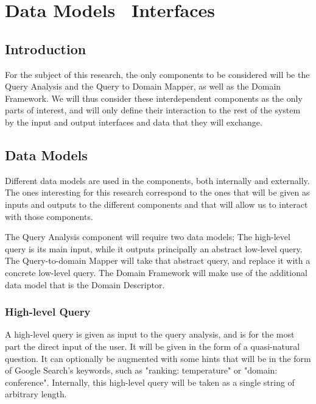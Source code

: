 \chapter{Data Models \amper\ Interfaces} %
\label{cha:data_models_interfaces}

\section{Introduction} %
\label{sec:introduction}

For the subject of this research, the only components to be considered will be the Query Analysis and the Query to Domain Mapper, as well as the Domain Framework. We will thus consider these interdependent components as the only parts of interest, and will only define their interaction to the rest of the system by the input and output interfaces and data that they will exchange.


\section{Data Models} %
\label{sec:data_models}
Different data models are used in the components, both internally and externally. The ones interesting for this research correspond to the ones that will be given as inputs and outputs to the different components and that will allow us to interact with those components.

The Query Analysis component will require two data models; The high-level query is its main input, while it outputs principally an abstract low-level query. The Query-to-domain Mapper will take that abstract query, and replace it with a concrete low-level query. The Domain Framework will make use of the additional data model that is the Domain Descriptor.

\subsection{High-level Query} %
\label{sub:high_level_query}

A high-level query is given as input to the query analysis, and is for the most part the direct input of the user. It will be given in the form of a quasi-natural question. It can optionally be augmented with some hints that will be in the form of Google Search's keywords, such as "ranking: temperature" or "domain: conference". Internally, this high-level query will be taken as a single string of arbitrary length.

